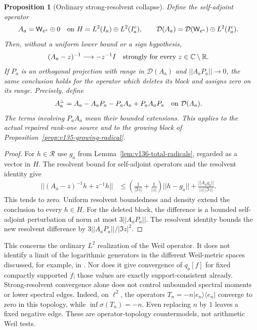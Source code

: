\documentclass[11pt]{article}
\def\norm#1{||#1||}%
\newtheorem{proposition}[theorem]{Proposition}
\theoremstyle{remark}
\newcommand{\norm}[1]{\left\lVert #1\right\rVert}
\begin{document}
\begin{proposition}[Ordinary strong-resolvent collapse]
\label{prop:v136-resolvent-collapse}
Define the self-adjoint operator
\[
 A_a=\mathsf W_{e^a}\oplus0
 \quad\hbox{on }H=L^2(I_a)\oplus L^2(I_a^c),
 \qquad
 \mathcal D(A_a)=\mathcal D(\mathsf W_{e^a})\oplus L^2(I_a^c).
\]
Then, without a uniform lower bound or a sign hypothesis,
\begin{equation}\label{eq:v136-resolvent-collapse}
 (A_a-z)^{-1}\longrightarrow-z^{-1}I
 \quad\hbox{strongly for every }z\in\mathbb C\setminus\mathbb R.
\end{equation}
If $P_a$ is an orthogonal projection with range in $\mathcal D(A_a)$
and $\norm{A_aP_a}\to0$, the same conclusion holds for the operator
which deletes its block and assigns zero on its range. Precisely, define
\[
 A_a^{\perp}=A_a-A_aP_a-P_aA_a+P_aA_aP_a
 \quad\hbox{on }\mathcal D(A_a).
\]
The terms involving $P_aA_a$ mean their bounded extensions.
This applies to the actual repaired rank-one source and to the growing
block of Proposition~\ref{prop:v135-growing-radical}.
\end{proposition}
\begin{proof}
For $h\in\mathcal R$ use $g_a$ from Lemma~\ref{lem:v136-total-radicals},
regarded as a vector in $H$. The resolvent bound for self-adjoint
operators and the resolvent identity give
\begin{align*}
 \norm{(A_a-z)^{-1}h+z^{-1}h}
 &\le\left(\frac1{|\Im z|}+\frac1{|z|}\right)\norm{h-g_a}
       +\frac{\norm{A_ag_a}}{|z|\,|\Im z|}.
\end{align*}
This tends to zero. Uniform resolvent boundedness and density extend
the conclusion to every $h\in H$. For the deleted block, the difference
is a bounded self-adjoint perturbation of norm at most
$3\norm{A_aP_a}$. The resolvent identity bounds the new resolvent
difference by $3\norm{A_aP_a}/|\Im z|^2$.
\end{proof}

This concerns the ordinary $L^2$ realization of the Weil operator.
It does not identify a limit of the logarithmic generators in the
different Weil-metric spaces discussed, for example, in
\cite[Section 7]{Suzuki2026}. Nor does it give convergence of
$q_a[f]$ for fixed compactly supported $f$; those values are exactly
support-consistent already. Strong-resolvent convergence alone does
not control unbounded spectral moments or lower spectral edges.
Indeed, on $\ell^2$, the operators
$T_n=-n|e_n\rangle\langle e_n|$ converge to zero in this topology,
while $\inf\sigma(T_n)=-n$. Even replacing $n$ by $1$ leaves a
fixed negative edge. These are operator-topology countermodels,
not arithmetic Weil tests.
\end{document}
